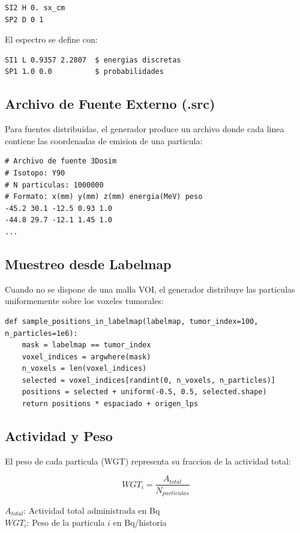 \documentclass[12pt,a4paper]{article}
\newcommand{\vardef}[2]{\noindent\textbf{#1}: #2\\}
\begin{document}
\begin{verbatim}
SI2 H 0. sx_cm
SP2 D 0 1
\end{verbatim}

El espectro se define con:

\begin{verbatim}
SI1 L 0.9357 2.2807  $ energias discretas
SP1 1.0 0.0          $ probabilidades
\end{verbatim}

\subsection{Archivo de Fuente Externo (.src)}

Para fuentes distribuidas, el generador produce un archivo donde cada linea contiene las coordenadas de emision de una particula:

\begin{verbatim}
# Archivo de fuente 3Dosim
# Isotopo: Y90
# N particulas: 1000000
# Formato: x(mm) y(mm) z(mm) energia(MeV) peso
-45.2 30.1 -12.5 0.93 1.0
-44.8 29.7 -12.1 1.45 1.0
...
\end{verbatim}

\subsection{Muestreo desde Labelmap}

Cuando no se dispone de una malla VOI, el generador distribuye las particulas uniformemente sobre los voxeles tumorales:

\begin{verbatim}
def sample_positions_in_labelmap(labelmap, tumor_index=100, n_particles=1e6):
    mask = labelmap == tumor_index
    voxel_indices = argwhere(mask)
    n_voxels = len(voxel_indices)
    selected = voxel_indices[randint(0, n_voxels, n_particles)]
    positions = selected + uniform(-0.5, 0.5, selected.shape)
    return positions * espaciado + origen_lps
\end{verbatim}

\subsection{Actividad y Peso}

El peso de cada particula (WGT) representa su fraccion de la actividad total:

$$
WGT_i = \frac{A_{total}}{N_{particulas}}
$$

\vardef{$A_{total}$}{Actividad total administrada en Bq}
\vardef{$WGT_i$}{Peso de la particula $i$ en Bq/historia}
\end{document}
